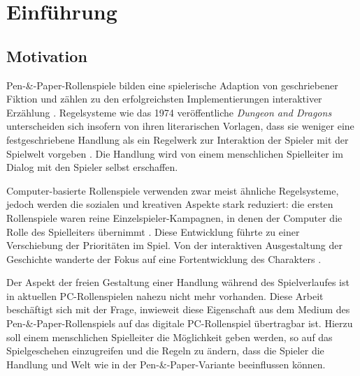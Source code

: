 \chapter{Einführung}


\section{Motivation}
\label{sec:Motivation}

Pen-\&-Paper-Rollenspiele bilden eine spielerische Adaption von geschriebener Fiktion und zählen zu den erfolgreichsten Implementierungen interaktiver Erzählung \cite{Tychsen2006}. Regelsysteme wie das 1974 veröffentliche \emph{Dungeon and Dragons} unterscheiden sich insofern von ihren literarischen Vorlagen, dass sie weniger eine festgeschriebene Handlung als ein Regelwerk zur Interaktion der Spieler mit der Spielwelt vorgeben \cite{Apperley2006}. Die Handlung wird von einem menschlichen Spielleiter im Dialog mit den Spieler selbst erschaffen.

Computer-basierte Rollenspiele verwenden zwar meist ähnliche Regelsysteme, jedoch werden die sozialen und kreativen Aspekte stark reduziert: die ersten Rollenspiele waren reine Einzelspieler-Kampagnen, in denen der Computer die Rolle des Spielleiters übernimmt \cite{Apperley2006}. Diese Entwicklung führte zu einer Verschiebung der Prioritäten im Spiel. Von der interaktiven Ausgestaltung der Geschichte wanderte der Fokus auf eine Fortentwicklung des Charakters \cite{Myers2003}.

Der Aspekt der freien Gestaltung einer Handlung während des Spielverlaufes ist in aktuellen PC-Rollenspielen nahezu nicht mehr vorhanden. Diese Arbeit beschäftigt sich mit der Frage, inwieweit diese Eigenschaft aus dem Medium des Pen-\&-Paper-Rollenspiels auf das digitale PC-Rollenspiel übertragbar ist. Hierzu soll einem menschlichen Spielleiter die Möglichkeit geben werden, so auf das Spielgeschehen einzugreifen und die Regeln zu ändern, dass die Spieler die Handlung und Welt wie in der Pen-\&-Paper-Variante beeinflussen können.

